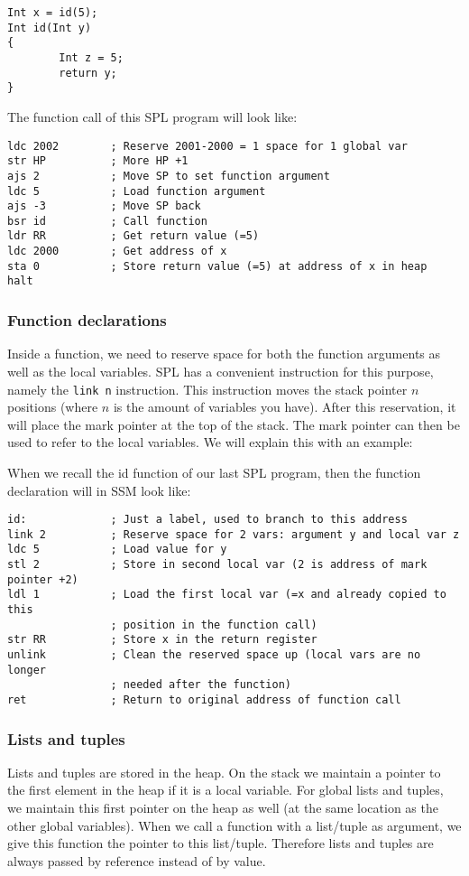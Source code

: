 \documentclass[a4paper]{article}
\begin{document}
\begin{lstlisting}
Int x = id(5);
Int id(Int y)
{
        Int z = 5;
        return y;
}
\end{lstlisting}
The function call of this SPL program will look like:
\begin{lstlisting}
ldc 2002        ; Reserve 2001-2000 = 1 space for 1 global var
str HP          ; More HP +1
ajs 2           ; Move SP to set function argument
ldc 5           ; Load function argument
ajs -3          ; Move SP back
bsr id          ; Call function
ldr RR          ; Get return value (=5)
ldc 2000        ; Get address of x
sta 0           ; Store return value (=5) at address of x in heap
halt
\end{lstlisting}

\subsubsection{Function declarations}
Inside a function, we need to reserve space for both the function arguments as well as the local variables. SPL has a convenient instruction for this purpose, namely the {\tt link n} instruction. This instruction moves the stack pointer $n$ positions (where $n$ is the amount of variables you have). After this reservation, it will place the mark pointer at the top of the stack. The mark pointer can then be used to refer to the local variables. We will explain this with an example:

When we recall the id function of our last SPL program, then the function declaration will in SSM look like:
\begin{lstlisting}
id:             ; Just a label, used to branch to this address
link 2          ; Reserve space for 2 vars: argument y and local var z
ldc 5           ; Load value for y
stl 2           ; Store in second local var (2 is address of mark pointer +2)
ldl 1           ; Load the first local var (=x and already copied to this 
                ; position in the function call)
str RR          ; Store x in the return register
unlink          ; Clean the reserved space up (local vars are no longer 
                ; needed after the function)
ret             ; Return to original address of function call
\end{lstlisting}

\subsubsection{Lists and tuples}
Lists and tuples are stored in the heap. On the stack we maintain a pointer to the first element in the heap if it is a local variable. For global lists and tuples, we maintain this first pointer on the heap as well (at the same location as the other global variables). When we call a function with a list/tuple as argument, we give this function the pointer to this list/tuple. Therefore lists and tuples are always passed by reference instead of by value. 
\end{document}
